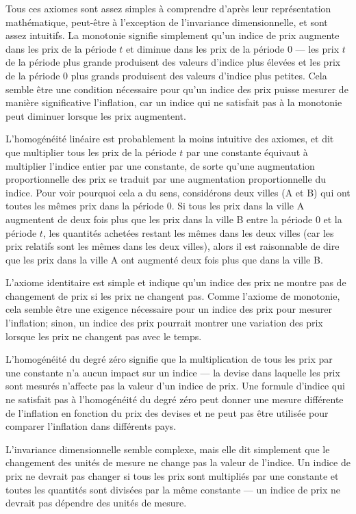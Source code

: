 \documentclass[
]{article}
\begin{document}
Tous ces axiomes sont assez simples à comprendre d'après leur représentation mathématique, peut-être à l'exception de l'invariance dimensionnelle, et sont assez intuitifs. La monotonie signifie simplement qu'un indice de prix augmente dans les prix de la période \(t\) et diminue dans les prix de la période 0 --- les prix \(t\) de la période plus grande produisent des valeurs d'indice plus élevées et les prix de la période 0 plus grands produisent des valeurs d'indice plus petites. Cela semble être une condition nécessaire pour qu'un indice des prix puisse mesurer de manière significative l'inflation, car un indice qui ne satisfait pas à la monotonie peut diminuer lorsque les prix augmentent.

L'homogénéité linéaire est probablement la moins intuitive des axiomes, et dit que multiplier tous les prix de la période \(t\) par une constante équivaut à multiplier l'indice entier par une constante, de sorte qu'une augmentation proportionnelle des prix se traduit par une augmentation proportionnelle du indice. Pour voir pourquoi cela a du sens, considérons deux villes (A et B) qui ont toutes les mêmes prix dans la période 0. Si tous les prix dans la ville A augmentent de deux fois plus que les prix dans la ville B entre la période 0 et la période \(t\), les quantités achetées restant les mêmes dans les deux villes (car les prix relatifs sont les mêmes dans les deux villes), alors il est raisonnable de dire que les prix dans la ville A ont augmenté deux fois plus que dans la ville B.

L'axiome identitaire est simple et indique qu'un indice des prix ne montre pas de changement de prix si les prix ne changent pas. Comme l'axiome de monotonie, cela semble être une exigence nécessaire pour un indice des prix pour mesurer l'inflation; sinon, un indice des prix pourrait montrer une variation des prix lorsque les prix ne changent pas avec le temps.

L'homogénéité du degré zéro signifie que la multiplication de tous les prix par une constante n'a aucun impact sur un indice --- la devise dans laquelle les prix sont mesurés n'affecte pas la valeur d'un indice de prix. Une formule d'indice qui ne satisfait pas à l'homogénéité du degré zéro peut donner une mesure différente de l'inflation en fonction du prix des devises et ne peut pas être utilisée pour comparer l'inflation dans différents pays.

L'invariance dimensionnelle semble complexe, mais elle dit simplement que le changement des unités de mesure ne change pas la valeur de l'indice. Un indice de prix ne devrait pas changer si tous les prix sont multipliés par une constante et toutes les quantités sont divisées par la même constante --- un indice de prix ne devrait pas dépendre des unités de mesure.
\end{document}
